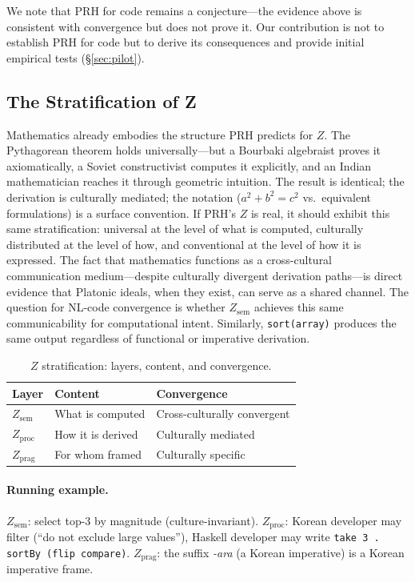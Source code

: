 \documentclass{article}
\theoremstyle{definition}
\newcommand{\Zsem}{Z_{\text{sem}}}
\newcommand{\Zproc}{Z_{\text{proc}}}
\newcommand{\Zprag}{Z_{\text{prag}}}
\begin{document}
We note that PRH for code remains a conjecture---the evidence above is consistent with convergence but does not prove it. Our contribution is not to establish PRH for code but to derive its consequences and provide initial empirical tests (\S\ref{sec:pilot}).

\subsection{The Stratification of Z}\label{sec:stratification}

Mathematics already embodies the structure PRH predicts for $Z$. The Pythagorean theorem holds universally---but a Bourbaki algebraist proves it axiomatically, a Soviet constructivist computes it explicitly, and an Indian mathematician reaches it through geometric intuition. The result is identical; the derivation is culturally mediated; the notation ($a^2 + b^2 = c^2$ vs.\ equivalent formulations) is a surface convention. If PRH's $Z$ is real, it should exhibit this same stratification: universal at the level of what is computed, culturally distributed at the level of how, and conventional at the level of how it is expressed. The fact that mathematics functions as a cross-cultural communication medium---despite culturally divergent derivation paths---is direct evidence that Platonic ideals, when they exist, can serve as a shared channel. The question for NL-code convergence is whether $\Zsem$ achieves this same communicability for computational intent. Similarly, \texttt{sort(array)} produces the same output regardless of functional or imperative derivation.

\begin{table}[t]
\centering
\caption{$Z$ stratification: layers, content, and convergence.}
\label{tab:stratification}
\small
\begin{tabular}{lll}
\toprule
\textbf{Layer} & \textbf{Content} & \textbf{Convergence} \\
\midrule
$\Zsem$ & What is computed & Cross-culturally convergent \\
$\Zproc$ & How it is derived & Culturally mediated \\
$\Zprag$ & For whom framed & Culturally specific \\
\bottomrule
\end{tabular}
\end{table}

\paragraph{Running example.}
$\Zsem$: select top-3 by magnitude (culture-invariant). $\Zproc$: Korean developer may filter (``do not exclude large values''), Haskell developer may write \texttt{take 3 . sortBy (flip compare)}. $\Zprag$: the suffix \emph{-ara} (a Korean imperative) is a Korean imperative frame.
\end{document}
